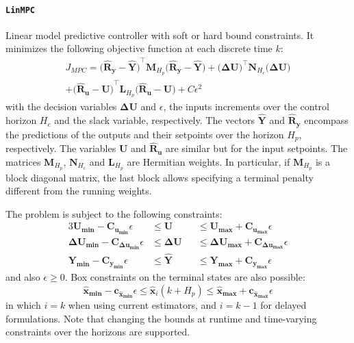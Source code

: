 \paragraph{\textnormal{\texttt{LinMPC}}}
Linear model predictive controller with soft or hard bound constraints. It minimizes the following objective function at each discrete time $k$:
\begin{multline}\label{eq:J_MPC}\!\!
J_{\mathit{MPC}} = 
    \mathbf{\big(\hat{R}_y - \hat{Y}\big)}^\intercal \mathbf{M}_{H_p} \mathbf{\big(\hat{R}_y - \hat{Y}\big)}   
    + \mathbf{\big(\Delta U\big)}^\intercal \mathbf{N}_{H_c} \mathbf{\big(\Delta U\big)} \\
    + \mathbf{\big(\hat{R}_u - U\big)}^\intercal \mathbf{L}_{H_p} \mathbf{\big(\hat{R}_u - U\big)} 
    + C \epsilon^2
\end{multline}
with the decision variables $\mathbf{\Delta U}$ and $\epsilon$, the inputs increments over the control horizon $H_c$ and the slack variable, respectively. The vectors $\mathbf{\hat{Y}}$ and $\mathbf{\hat{R}_y}$ encompass the predictions of the outputs and their setpoints over the horizon $H_p$, respectively. The variables $\mathbf{U}$ and $\mathbf{\hat{R}_u}$ are similar but for the input setpoints. The matrices $\mathbf{M}_{H_p}$, $\mathbf{N}_{H_c}$ and $\mathbf{L}_{H_p}$ are Hermitian weights. In particular, if $\mathbf{M}_{H_p}$ is a block diagonal matrix, the last block allows specifying a terminal penalty different from the running weights.

The problem is subject to the following constraints:
\begin{alignat}{3}
    \mathbf{U_{min}  - C_{u_{min}}}  \epsilon 
         &\le \mathbf{U}  
        &&\le \mathbf{U_{max}  + C_{u_{max}}}  \epsilon \\
    \mathbf{\Delta U_{min} - C_{\Delta u_{min}}} \epsilon 
         &\le \mathbf{\Delta U} 
        &&\le \mathbf{\Delta U_{max} + C_{\Delta u_{max}}} \epsilon \\
    \mathbf{Y_{min}  - C_{y_{min}}}  \epsilon 
         &\le \mathbf{\hat{Y}} 
        &&\le \mathbf{Y_{max}  + C_{y_{max}}}  \epsilon
\end{alignat}
and also $\epsilon \ge 0$. Box constraints on the terminal states are also possible: 
\begin{equation}
\mathbf{\hat{x}_{min}} {-} \mathbf{c_{\hat{x}_{min}}}\epsilon \le \mathbf{\hat{x}}_{i}(k{+}H_p) \le \mathbf{\hat{x}_{max}} + \mathbf{c_{\hat{x}_{max}}}\epsilon
\end{equation}
in which $i=k$ when using current estimators, and $i=k-1$ for delayed formulations. Note that changing the bounds at runtime and time-varying constraints over the horizons are supported.

